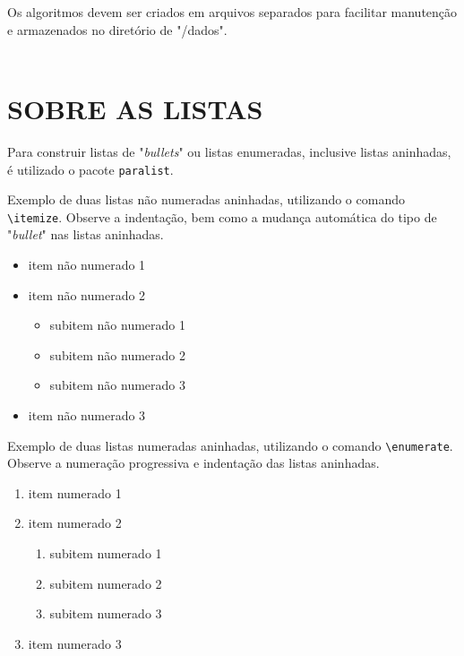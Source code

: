 Os algoritmos devem ser criados em arquivos separados para facilitar manutenção e armazenados no diretório de "/dados".\\
\\



\chapter{SOBRE AS LISTAS}
\label{chap:apSobreLista}

Para construir listas de "\textit{bullets}"{} ou listas enumeradas, inclusive listas aninhadas, é utilizado o pacote \verb|paralist|.

Exemplo de duas listas não numeradas aninhadas, utilizando o comando \verb|\itemize|. Observe a indentação, bem como a mudança automática do tipo de "\textit{bullet}"{} nas listas aninhadas.

\begin{itemize}
    \item item não numerado 1
    \item item não numerado 2
    \begin{itemize}
        \item subitem não numerado 1
        \item subitem não numerado 2
        \item subitem não numerado 3
    \end{itemize}
    \item item não numerado 3
\end{itemize}

Exemplo de duas listas numeradas aninhadas, utilizando o comando \verb|\enumerate|. Observe a numeração progressiva e indentação das listas aninhadas.

\begin{enumerate}
    \item item numerado 1
    \item item numerado 2
    \begin{enumerate}
        \item subitem numerado 1
        \item subitem numerado 2
        \item subitem numerado 3
    \end{enumerate}
    \item item numerado 3
\end{enumerate}

